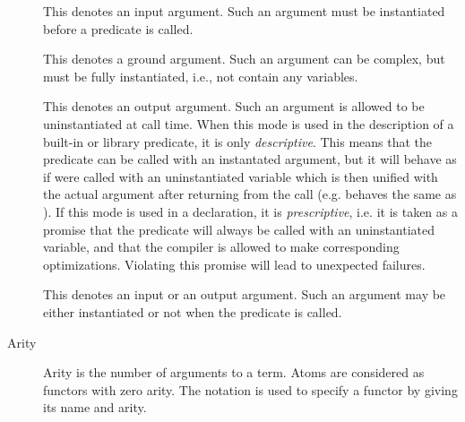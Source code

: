 \begin{description}

\item[]
This denotes an input argument. Such an argument must be instantiated before
a predicate is called.

\item[]
This denotes a ground argument. Such an argument can be complex,
but must be fully instantiated, i.e., not contain any variables.

\item[]
This denotes an output argument.  Such an argument is allowed to be
uninstantiated at call time.  When this mode is used in the description
of a built-in or library predicate, it is only \emph{descriptive}.  This means
that the predicate can be called with an instantated argument, but it will
behave as if were called with an uninstantiated variable which is then
unified with the actual argument after returning from the call (e.g.
 behaves the same as ).
If this mode is used in a 
declaration, it is \emph{prescriptive}, i.e. it is taken as a promise that
the predicate will always be called with an uninstantiated variable, and
that the compiler is allowed to make corresponding optimizations.
Violating this promise will lead to unexpected failures.

\item[]
This denotes an input or an output argument. Such an argument may be either
instantiated or not when the predicate is called.


\item[Arity]
Arity is the number of arguments to a term.
Atoms are considered as functors with zero arity.
The notation 
is used to specify a functor by giving its name and arity.


\end{description}
